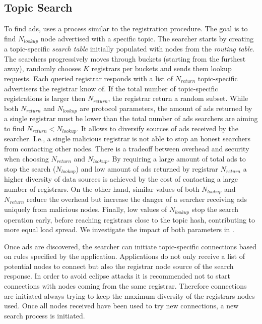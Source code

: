 \subsection{Topic Search}\label{sec:lookup}
To find ads, \sysname uses a process similar to the registration procedure. 
The goal is to find $N_\textit{lookup}$ node advertised with a specific topic. 
The searcher starts by creating a topic-specific \emph{search table} initially populated with nodes from the \emph{routing table}. 
The searchers progressively moves through buckets (starting from the furthest away), randomly chooses $K$ registrars per buckets and sends them lookup requests. 
Each queried registrar responds with a list of $N_\textit{return}$ topic-specific advertisers the registrar know of. If the total number of topic-specific registrations is larger then $N_\textit{return}$, the registrar return a random subset. While both $N_\textit{return}$ and $N_\textit{lookup}$ are protocol parameters, the amount of ads returned by a single registrar must be lower than the total number of ads searchers are aiming to find $N_\textit{return} < N_\textit{lookup}$. It allows to diversify sources of ads received by the searcher. I.e., a single malicious registrar is not able to stop an honest searchers from contacting other nodes.
There is a tradeoff between overhead and security when choosing $N_\textit{return}$ and $N_\textit{lookup}$. 
By requiring a large amount of total ads to stop the search ($N_\textit{lookup}$) and low amount of ads returned by registrar $N_\textit{return}$ a higher diversity of data sources is achieved by the cost of contacting a large number of registrars. On the other hand, similar values of both $N_\textit{lookup}$ and $N_\textit{return}$ reduce the overhead but increase the danger of a searcher receiving ads uniquely from malicious nodes. Finally, low values of $N_\textit{lookup}$ stop the search operation early,  before reaching registrars close to the topic hash, contributing to more equal load spread. We investigate the impact of both parameters in . 

Once ads are discovered,  the searcher can initiate topic-specific connections based on rules specified by the application. 
Applications do not only receive a list of potential nodes to connect but also the registrar node source of the search response.
In order to avoid eclipse attacks it is recommended not to start connections with nodes coming from the same registrar. 
Therefore connections are initiated always trying to keep the maximum diversity of the  registrars nodes used.
Once all nodes received have been used to try new connections,  a new search process is initiated. 

